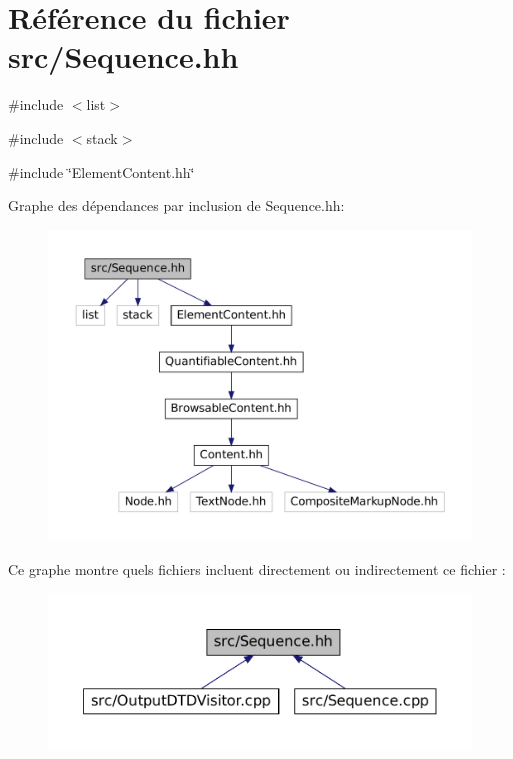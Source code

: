 \hypertarget{_sequence_8hh}{
\section{Référence du fichier src/Sequence.hh}
\label{_sequence_8hh}
}
{\ttfamily \#include $<$list$>$}\par
{\ttfamily \#include $<$stack$>$}\par
{\ttfamily \#include \char`\"{}ElementContent.hh\char`\"{}}\par
Graphe des dépendances par inclusion de Sequence.hh:\nopagebreak
\begin{figure}[H]
\begin{center}
\leavevmode
\includegraphics[width=400pt]{_sequence_8hh__incl}
\end{center}
\end{figure}
Ce graphe montre quels fichiers incluent directement ou indirectement ce fichier :\nopagebreak
\begin{figure}[H]
\begin{center}
\leavevmode
\includegraphics[width=400pt]{_sequence_8hh__dep__incl}
\end{center}
\end{figure}
